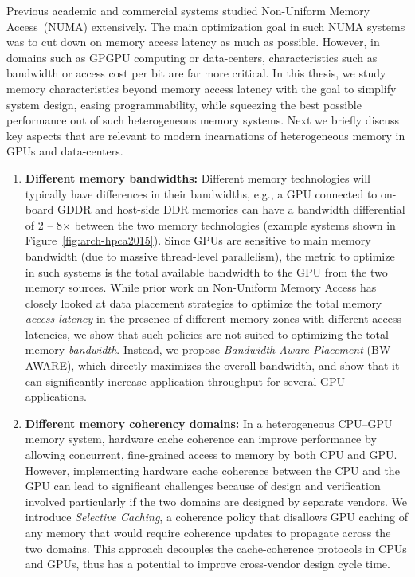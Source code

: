Previous academic and commercial systems studied Non-Uniform Memory Access~(NUMA)
extensively. The main optimization goal in such NUMA systems was to cut
down on memory access latency as much as possible. However, in domains such as
GPGPU computing or data-centers, characteristics
such as bandwidth or access cost per bit are far more critical. In this thesis, we study memory characteristics
beyond memory access latency with the goal to simplify system design, easing
programmability, while squeezing the best possible performance out
of such heterogeneous memory systems.  Next we briefly discuss key aspects that
are relevant to modern incarnations of heterogeneous memory in GPUs and
data-centers.

\begin{enumerate}
\item
\textbf{Different memory bandwidths:}
Different memory technologies will typically have differences in their
bandwidths, e.g., a GPU connected to on-board GDDR and host-side DDR memories
can have a bandwidth differential of 2 -- 8$\times$ between the two
memory technologies (example systems shown in Figure~\ref{fig:arch-hpca2015}).
Since GPUs are sensitive to main memory bandwidth (due to massive thread-level
parallelism), the metric to optimize in such systems is the total available
bandwidth to the GPU from the two memory sources. While prior work on
Non-Uniform Memory Access has closely looked at data placement strategies
to optimize the total memory {\it access latency} in the presence of different
memory zones with different access latencies, we show that such policies are not
suited to optimizing the total memory {\it bandwidth}. Instead, we propose {\it
Bandwidth-Aware Placement} (BW-AWARE), which directly maximizes the overall
bandwidth, and show that it can significantly increase application throughput
for several GPU applications.

\item
\textbf{Different memory coherency domains:} 
In a heterogeneous CPU--GPU memory system, hardware cache coherence can improve
performance by allowing concurrent, fine-grained access to memory by both CPU
and GPU.  However, implementing hardware cache coherence between the CPU and the
GPU can lead to significant challenges because of design and verification
involved particularly if the two domains are designed by separate vendors. We
introduce {\it Selective Caching}, a coherence policy that disallows GPU caching
of any memory that would require coherence updates to propagate across the two
domains. This approach decouples the cache-coherence protocols in CPUs and GPUs,
thus has a potential to improve cross-vendor design cycle time.


\end{enumerate}
